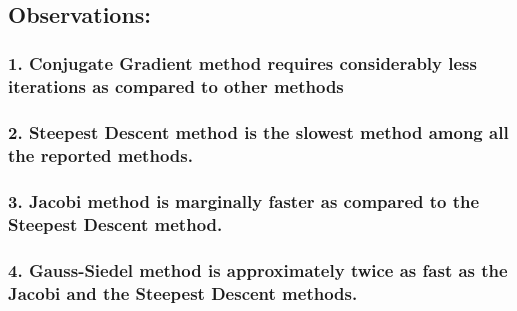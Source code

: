 \documentclass[11pt]{article}
\begin{document}
    \begin{center}
    \end{center}
    { \hspace*{\fill} \\}
    
    \hypertarget{observations}{%
\subsection{Observations:}\label{observations}}

    \hypertarget{conjugate-gradient-method-requires-considerably-less-iterations-as-compared-to-other-methods}{%
\subsubsection{1. Conjugate Gradient method requires considerably less
iterations as compared to other
methods}\label{conjugate-gradient-method-requires-considerably-less-iterations-as-compared-to-other-methods}}

    \hypertarget{steepest-descent-method-is-the-slowest-method-among-all-the-reported-methods.}{%
\subsubsection{2. Steepest Descent method is the slowest method among
all the reported
methods.}\label{steepest-descent-method-is-the-slowest-method-among-all-the-reported-methods.}}

    \hypertarget{jacobi-method-is-marginally-faster-as-compared-to-the-steepest-descent-method.}{%
\subsubsection{3. Jacobi method is marginally faster as compared to the
Steepest Descent
method.}\label{jacobi-method-is-marginally-faster-as-compared-to-the-steepest-descent-method.}}

    \hypertarget{gauss-siedel-method-is-approximately-twice-as-fast-as-the-jacobi-and-the-steepest-descent-methods.}{%
\subsubsection{4. Gauss-Siedel method is approximately twice as fast as
the Jacobi and the Steepest Descent
methods.}\label{gauss-siedel-method-is-approximately-twice-as-fast-as-the-jacobi-and-the-steepest-descent-methods.}}
\end{document}
